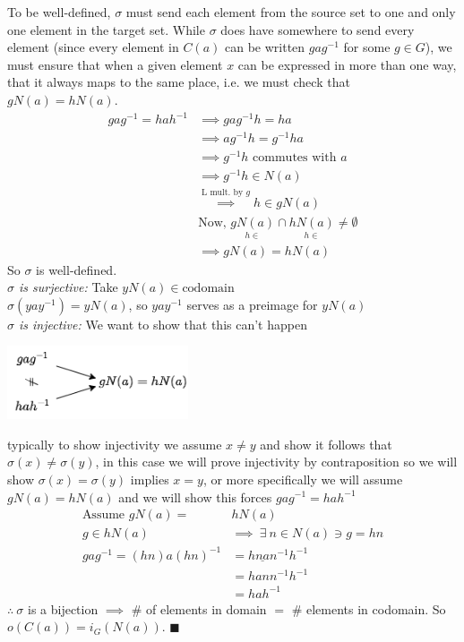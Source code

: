 \begin{theorem}
\begin{center}
\end{center}%
To be well-defined, $\sigma$ must send each element from the source set to one and only one element in the target set. While $\sigma$ does have somewhere to send every element (since every element in $C(a)$ can be written $gag^{-1}$ for some $g\in G$), we must ensure that when a given element $x$ can be expressed in more than one way, that it always maps to the same place, i.e. we must check that $gN(a)=hN(a)$.
\begin{align}
    gag^{-1} = hah^{-1} &\implies gag^{-1}h=ha \nonumber \\
    &\implies ag^{-1}h=g^{-1}ha \nonumber \\
    &\implies g^{-1}h \text{ commutes with } a \nonumber \\
    &\implies g^{-1}h \in N(a) \nonumber \\
    &\overset{\text{L mult. by }g}{\implies} h\in gN(a) \nonumber \\
    &\text{Now, }\underset{h\in}{gN(a)} \cap \underset{h\in}{hN(a)} \not = \emptyset \nonumber\\
    &\implies gN(a) = hN(a)
\end{align}
So $\sigma$ is well-defined. \\
\noindent \textit{$\sigma$ is surjective:} Take $yN(a) \in \text{codomain}$\\
$\sigma(yay^{-1})=yN(a)$, so $yay^{-1}$ serves as a preimage for $yN(a)$ \steezybreak\\
\noindent \textit{$\sigma$ is injective:} We want to show that this can't happen \\
\begin{center}
    \includegraphics[width=0.4\textwidth]{Figures/noninjective.png}
\end{center}
typically to show injectivity we assume $x\not = y$ and show it follows that $\sigma(x)\not = \sigma(y)$, in this case we will prove injectivity by contraposition so we will show $\sigma(x)=\sigma(y)$ implies $x=y$, or more specifically we will assume $gN(a)=hN(a)$ and we will show this forces $gag^{-1}=hah^{-1}$
\begin{align}
    \text{Assume }gN(a)=&hN(a) \nonumber \\
    g\in hN(a) &\implies \ \exists \ n\in N(a) \ni g = hn \nonumber \\
    gag^{-1}=(hn)a(hn)^{-1}&= h\underline{na}n^{-1}h^{-1} \nonumber \\
    &= hann^{-1}h^{-1} \nonumber \\
    &=hah^{-1} \nonumber
\end{align}
 $\therefore \ \sigma$ is a bijection $\implies$ \# of elements in domain $=$ \# elements in codomain. So $o(C(a))=i_G(N(a))$. $\blacksquare$
\end{theorem}
